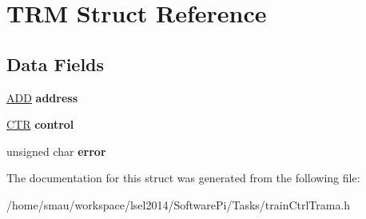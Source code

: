 \hypertarget{structTRM}{\section{T\-R\-M Struct Reference}
\label{structTRM}
}
\subsection*{Data Fields}
\begin{DoxyCompactItemize}
\item 
\hypertarget{structTRM_ac54f581ec0cee6cffadd925b54a6c2cb}{\hyperlink{unionADD}{A\-D\-D} {\bfseries address}}\label{structTRM_ac54f581ec0cee6cffadd925b54a6c2cb}

\item 
\hypertarget{structTRM_a007bedfa65b036b79c06dfc6016d9c50}{\hyperlink{unionCTR}{C\-T\-R} {\bfseries control}}\label{structTRM_a007bedfa65b036b79c06dfc6016d9c50}

\item 
\hypertarget{structTRM_a1e262d1eba440bba87e7291d373e0f72}{unsigned char {\bfseries error}}\label{structTRM_a1e262d1eba440bba87e7291d373e0f72}

\end{DoxyCompactItemize}


The documentation for this struct was generated from the following file\-:\begin{DoxyCompactItemize}
\item 
/home/smau/workspace/lsel2014/\-Software\-Pi/\-Tasks/train\-Ctrl\-Trama.\-h\end{DoxyCompactItemize}
